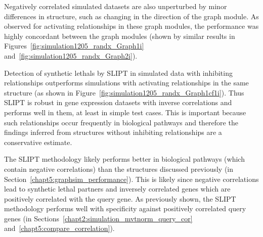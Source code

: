 Negatively correlated simulated datasets are also unperturbed by minor differences in  structure, such as changing in the direction of the graph module. As observed for activating relationships in these graph modules, the performance was highly concordant between the graph modules (shown by similar results in Figures~\ref{fig:simulation1205_randx_Graph1i} and~\ref{fig:simulation1205_randx_Graph2i}).

Detection of \glspl{synthetic lethal} by \gls{SLIPT} in simulated data with inhibiting relationships outperforms simulations with activating relationships in the same  structure (as shown in Figure~\ref{fig:simulation1205_randx_Graph1cf1i}). Thus \gls{SLIPT} is robust in \gls{gene expression} datasets with inverse correlations and performs well in them, at least in simple test cases. This is important because such relationships occur frequently in biological pathways and therefore the findings inferred from  structures without inhibiting relationships are a conservative estimate.

The \gls{SLIPT} methodology likely performs better in biological pathways (which contain negative correlations) than the  structures discussed previously (in Section~\ref{chapt5:graphsim_performance}). This is likely since negative correlations lead to \gls{synthetic lethal} partners and inversely correlated genes which are positively correlated with the query gene. As previously shown, the \gls{SLIPT} methodology performs well with specificity against positively correlated query genes (in Sections~\ref{chapt2:simulation_mvtnorm_query_cor} and~\ref{chapt5:compare_correlation}).%

